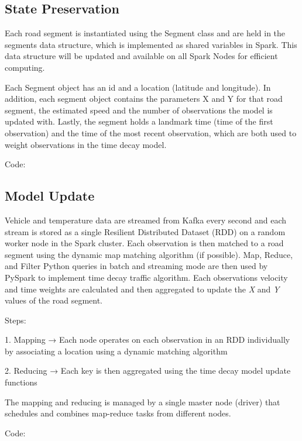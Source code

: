 \documentclass{vldb}
\begin{document}
\subsection{State Preservation}
Each road segment is instantiated using the Segment class and are held in the segments data structure, which is implemented as shared variables in Spark. This data structure will be updated and available on all Spark Nodes for efficient computing. 

Each Segment object has an id and a location (latitude and longitude). In addition, each segment object contains the parameters X and Y for that road segment, the estimated speed and the number of observations the model is updated with. Lastly, the segment holds a landmark time (time of the first observation) and the time of the most recent observation, which are both used to weight observations in the time decay model. 

Code: 



\subsection{Model Update}

Vehicle and temperature data are streamed from Kafka every second and each stream is stored as a single Resilient Distributed Dataset (RDD) on a random worker node in the Spark cluster. Each observation is then matched to a road segment using the dynamic map matching algorithm (if possible). Map, Reduce, and Filter Python queries in batch and streaming mode are then used by PySpark to implement time decay traffic algorithm. Each observations velocity and time weights are calculated and then aggregated to update the \textit{X} and \textit{Y} values of the road segment.

Steps:

1. Mapping → Each node operates on each observation in an RDD individually by associating a location using a dynamic matching algorithm

2. Reducing → Each key is then aggregated using the time decay model update functions

The mapping and reducing is managed by a single master node (driver) that schedules and combines map-reduce tasks from different nodes.

Code:


\end{document}
